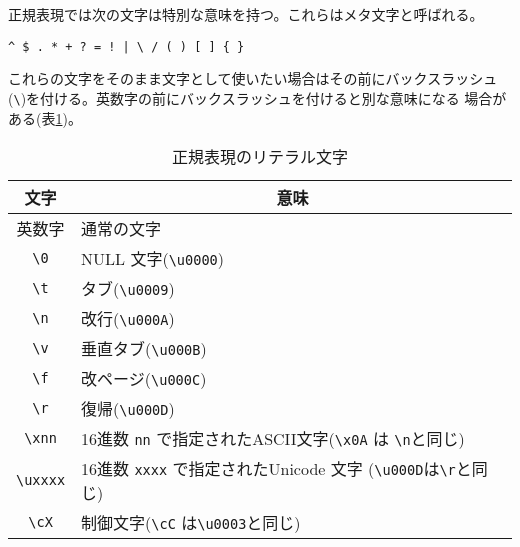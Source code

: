 正規表現では次の文字は特別な意味を持つ。これらはメタ文字と呼ばれる。
\begin{verbatim}
^ $ . * + ? = ! | \ / ( ) [ ] { }
\end{verbatim}
これらの文字をそのまま文字として使いたい場合はその前にバックスラッシュ
(\verb+\+)を付ける。英数字の前にバックスラッシュを付けると別な意味になる
場合がある(表\ref{character})。
\begin{table}[ht]
 \caption{正規表現のリテラル文字}\label{character}
\begin{center}
 \begin{tabular}{|c|l|}\hline
  文字&\multicolumn{1}{c|}{意味}\\\hline
  英数字&通常の文字 \\\hline
  \verb+\0+&NULL 文字(\verb+\u0000+) \\ \hline
  \verb+\t+& タブ(\verb+\u0009+)\\ \hline
  \verb+\n+& 改行(\verb+\u000A+)\\ \hline
  \verb+\v+& 垂直タブ(\verb+\u000B+)\\ \hline
  \verb+\f+& 改ページ(\verb+\u000C+)\\ \hline
  \verb+\r+& 復帰(\verb+\u000D+)\\ \hline
  \verb+\xnn+& 16進数 \texttt{nn} で指定されたASCII文字(\verb+\x0A+ は
      \verb+\n+と同じ)\\ \hline
  \verb+\uxxxx+&16進数 \texttt{xxxx} で指定されたUnicode 文字
      (\verb+\u000D+は\verb+\r+と同じ)\\ \hline
  \verb+\cX+& 制御文字(\verb+\cC+ は\verb+\u0003+と同じ)\\ \hline
 \end{tabular}
\end{center}
\end{table}
